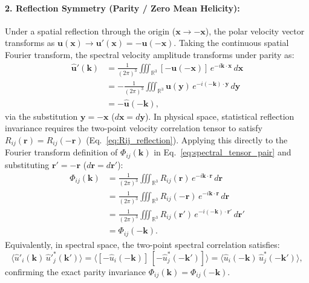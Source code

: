 \documentclass[lineno]{jfm}
\begin{document}
\paragraph{2. Reflection Symmetry (Parity / Zero Mean Helicity):}
Under a spatial reflection through the origin ($\mathbf{x} \to -\mathbf{x}$), the polar velocity vector transforms as $\mathbf{u}(\mathbf{x}) \to \mathbf{u}'(\mathbf{x}) = -\mathbf{u}(-\mathbf{x})$. Taking the continuous spatial Fourier transform, the spectral velocity amplitude transforms under parity as:
\begin{align}
\hat{\mathbf{u}}'(\mathbf{k}) &= \frac{1}{(2\pi)^3} \iiint_{\mathbb{R}^3} [-\mathbf{u}(-\mathbf{x})]\,e^{-i \mathbf{k} \cdot \mathbf{x}}\,d\mathbf{x} \nonumber \\
&= -\frac{1}{(2\pi)^3} \iiint_{\mathbb{R}^3} \mathbf{u}(\mathbf{y})\,e^{-i(-\mathbf{k})\cdot\mathbf{y}}\,d\mathbf{y} \nonumber \\
&= -\hat{\mathbf{u}}(-\mathbf{k}),
\label{eq:u_hat_parity}
\end{align}
via the substitution $\mathbf{y} = -\mathbf{x}$ ($d\mathbf{x} = d\mathbf{y}$). In physical space, statistical reflection invariance requires the two-point velocity correlation tensor to satisfy $R_{ij}(\mathbf{r}) = R_{ij}(-\mathbf{r})$ (Eq.~\eqref{eq:Rij_reflection}). Applying this directly to the Fourier transform definition of $\Phi_{ij}(\mathbf{k})$ in Eq.~\eqref{eq:spectral_tensor_pair} and substituting $\mathbf{r}' = -\mathbf{r}$ ($d\mathbf{r} = d\mathbf{r}'$):
\begin{align}
\Phi_{ij}(\mathbf{k}) &= \frac{1}{(2\pi)^3} \iiint_{\mathbb{R}^3} R_{ij}(\mathbf{r})\,e^{-i \mathbf{k} \cdot \mathbf{r}}\,d\mathbf{r} \nonumber \\
&= \frac{1}{(2\pi)^3} \iiint_{\mathbb{R}^3} R_{ij}(-\mathbf{r})\,e^{-i \mathbf{k} \cdot \mathbf{r}}\,d\mathbf{r} \nonumber \\
&= \frac{1}{(2\pi)^3} \iiint_{\mathbb{R}^3} R_{ij}(\mathbf{r}')\,e^{-i(-\mathbf{k})\cdot\mathbf{r}'}\,d\mathbf{r}' \nonumber \\
&= \Phi_{ij}(-\mathbf{k}).
\label{eq:Phi_reflection}
\end{align}
Equivalently, in spectral space, the two-point spectral correlation satisfies:
\begin{equation}
\langle \hat{u}'_i(\mathbf{k})\,\hat{u}'^*_j(\mathbf{k}') \rangle = \langle [-\hat{u}_i(-\mathbf{k})]\,[-\hat{u}^*_j(-\mathbf{k}')] \rangle = \langle \hat{u}_i(-\mathbf{k})\,\hat{u}^*_j(-\mathbf{k}') \rangle,
\end{equation}
confirming the exact parity invariance $\Phi_{ij}(\mathbf{k}) = \Phi_{ij}(-\mathbf{k})$.
\end{document}
